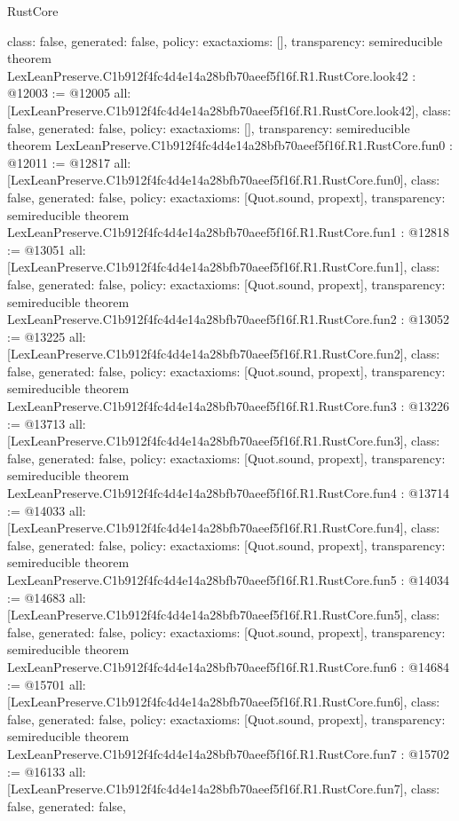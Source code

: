 \begin{lexlean}{RustCore}
\begin{coremodule}
{  class: false,
  generated: false,
  policy: exact{axioms: []},
  transparency: semireducible
}
theorem LexLeanPreserve.C1b912f4fc4d4e14a28bfb70aeef5f16f.R1.RustCore.look42 : @12003 := @12005 {
  all: [LexLeanPreserve.C1b912f4fc4d4e14a28bfb70aeef5f16f.R1.RustCore.look42],
  class: false,
  generated: false,
  policy: exact{axioms: []},
  transparency: semireducible
}
theorem LexLeanPreserve.C1b912f4fc4d4e14a28bfb70aeef5f16f.R1.RustCore.fun0 : @12011 := @12817 {
  all: [LexLeanPreserve.C1b912f4fc4d4e14a28bfb70aeef5f16f.R1.RustCore.fun0],
  class: false,
  generated: false,
  policy: exact{axioms: [Quot.sound, propext]},
  transparency: semireducible
}
theorem LexLeanPreserve.C1b912f4fc4d4e14a28bfb70aeef5f16f.R1.RustCore.fun1 : @12818 := @13051 {
  all: [LexLeanPreserve.C1b912f4fc4d4e14a28bfb70aeef5f16f.R1.RustCore.fun1],
  class: false,
  generated: false,
  policy: exact{axioms: [Quot.sound, propext]},
  transparency: semireducible
}
theorem LexLeanPreserve.C1b912f4fc4d4e14a28bfb70aeef5f16f.R1.RustCore.fun2 : @13052 := @13225 {
  all: [LexLeanPreserve.C1b912f4fc4d4e14a28bfb70aeef5f16f.R1.RustCore.fun2],
  class: false,
  generated: false,
  policy: exact{axioms: [Quot.sound, propext]},
  transparency: semireducible
}
theorem LexLeanPreserve.C1b912f4fc4d4e14a28bfb70aeef5f16f.R1.RustCore.fun3 : @13226 := @13713 {
  all: [LexLeanPreserve.C1b912f4fc4d4e14a28bfb70aeef5f16f.R1.RustCore.fun3],
  class: false,
  generated: false,
  policy: exact{axioms: [Quot.sound, propext]},
  transparency: semireducible
}
theorem LexLeanPreserve.C1b912f4fc4d4e14a28bfb70aeef5f16f.R1.RustCore.fun4 : @13714 := @14033 {
  all: [LexLeanPreserve.C1b912f4fc4d4e14a28bfb70aeef5f16f.R1.RustCore.fun4],
  class: false,
  generated: false,
  policy: exact{axioms: [Quot.sound, propext]},
  transparency: semireducible
}
theorem LexLeanPreserve.C1b912f4fc4d4e14a28bfb70aeef5f16f.R1.RustCore.fun5 : @14034 := @14683 {
  all: [LexLeanPreserve.C1b912f4fc4d4e14a28bfb70aeef5f16f.R1.RustCore.fun5],
  class: false,
  generated: false,
  policy: exact{axioms: [Quot.sound, propext]},
  transparency: semireducible
}
theorem LexLeanPreserve.C1b912f4fc4d4e14a28bfb70aeef5f16f.R1.RustCore.fun6 : @14684 := @15701 {
  all: [LexLeanPreserve.C1b912f4fc4d4e14a28bfb70aeef5f16f.R1.RustCore.fun6],
  class: false,
  generated: false,
  policy: exact{axioms: [Quot.sound, propext]},
  transparency: semireducible
}
theorem LexLeanPreserve.C1b912f4fc4d4e14a28bfb70aeef5f16f.R1.RustCore.fun7 : @15702 := @16133 {
  all: [LexLeanPreserve.C1b912f4fc4d4e14a28bfb70aeef5f16f.R1.RustCore.fun7],
  class: false,
  generated: false,
}
\end{coremodule}
\end{lexlean}
